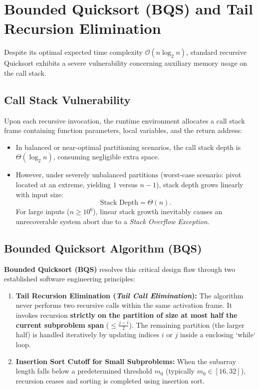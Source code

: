 \FloatBarrier
\section{Bounded Quicksort (BQS) and Tail Recursion Elimination}
\label{sec:bounded-quicksort}

Despite its optimal expected time complexity $\mathcal{O}(n \log_2 n)$, standard recursive Quicksort exhibits a severe vulnerability concerning auxiliary memory usage on the call stack.

\subsection{Call Stack Vulnerability}
\label{subsec:stack-overflow-issue}

Upon each recursive invocation, the runtime environment allocates a call stack frame containing function parameters, local variables, and the return address:
\begin{itemize}
  \item In balanced or near-optimal partitioning scenarios, the call stack depth is $\Theta(\log_2 n)$, consuming negligible extra space.
  \item However, under severely unbalanced partitions (worst-case scenario: pivot located at an extreme, yielding $1$ versus $n-1$), stack depth grows linearly with input size:
  \begin{equation}
    \text{Stack Depth} = \Theta(n).
  \end{equation}
  For large inputs ($n \ge 10^6$), linear stack growth inevitably causes an unrecoverable system abort due to a \textit{Stack Overflow Exception}.
\end{itemize}

\subsection{Bounded Quicksort Algorithm (BQS)}
\label{subsec:bqs-algorithm}

\textbf{Bounded Quicksort (BQS)} resolves this critical design flaw through two established software engineering principles:
\begin{enumerate}
  \item \textbf{Tail Recursion Elimination (\textit{Tail Call Elimination}):} The algorithm never performs two recursive calls within the same activation frame. It invokes recursion \textbf{strictly on the partition of size at most half the current subproblem span} ($\le \frac{j - i}{2}$). The remaining partition (the larger half) is handled iteratively by updating indices $i$ or $j$ inside a enclosing `while` loop.
  \item \textbf{Insertion Sort Cutoff for Small Subproblems:} When the subarray length falls below a predetermined threshold $m_0$ (typically $m_0 \in [16, 32]$), recursion ceases and sorting is completed using insertion sort.
\end{enumerate}

